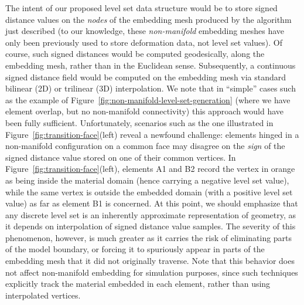 The intent of our proposed level set data structure would be to store
signed distance values on the \emph{nodes} of the embedding mesh
produced by the algorithm just described (to our knowledge, these
\emph{non-manifold} embedding meshes have only been previously used to
store deformation data, not level set values). Of course, such signed
distances would be computed geodesically, along the embedding mesh,
rather than in the Euclidean sense. Subsequently, a continuous signed
distance field would be computed on the embedding mesh via standard
bilinear (2D) or trilinear (3D) interpolation. We note that in
``simple'' cases such as the example of
Figure~\ref{fig:non-manifold-level-set-generation} (where we have
element overlap, but no non-manifold connectivity) this approach would
have been fully sufficient. Unfortunately, scenarios such as the one
illustrated in Figure~\ref{fig:transition-face}(left) reveal a
newfound challenge: elements hinged in a non-manifold configuration on
a common face may disagree on the \emph{sign} of the signed distance
value stored on one of their common vertices. In
Figure~\ref{fig:transition-face}(left), elements \textsf{A1} and
\textsf{B2} record the vertex in orange as being inside the material
domain (hence carrying a negative level set value), while the same
vertex is outside the embedded domain (with a positive level set
value) as far as element \textsf{B1} is concerned. At this point, we
should emphasize that any discrete level set is an inherently
approximate representation of geometry, as it depends on interpolation
of signed distance value samples. The severity of this phenomenon,
however, is much greater as it carries the risk of eliminating parts
of the model boundary, or forcing it to spuriously appear in parts of
the embedding mesh that it did not originally traverse.  Note that
this behavior does not affect non-manifold embedding for simulation
purposes, since such techniques explicitly track the material embedded
in each element, rather than using interpolated vertices. 

